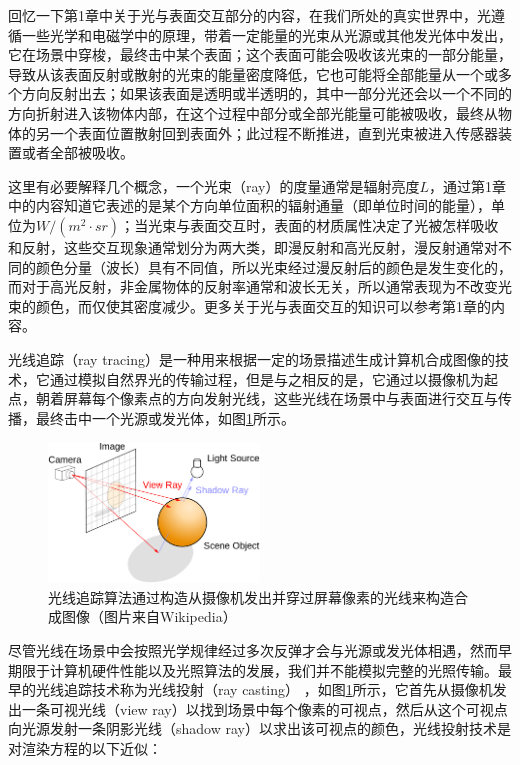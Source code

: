 回忆一下第1章中关于光与表面交互部分的内容，在我们所处的真实世界中，光遵循一些光学和电磁学中的原理，带着一定能量的光束从光源或其他发光体中发出，它在场景中穿梭，最终击中某个表面；这个表面可能会吸收该光束的一部分能量，导致从该表面反射或散射的光束的能量密度降低，它也可能将全部能量从一个或多个方向反射出去；如果该表面是透明或半透明的，其中一部分光还会以一个不同的方向折射进入该物体内部，在这个过程中部分或全部光能量可能被吸收，最终从物体的另一个表面位置散射回到表面外；此过程不断推进，直到光束被进入传感器装置或者全部被吸收。

这里有必要解释几个概念，一个光束（ray）的度量通常是辐射亮度$L$，通过第1章中的内容知道它表述的是某个方向单位面积的辐射通量（即单位时间的能量），单位为$W/(m^2\cdot sr)$；当光束与表面交互时，表面的材质属性决定了光被怎样吸收和反射，这些交互现象通常划分为两大类，即漫反射和高光反射，漫反射通常对不同的颜色分量（波长）具有不同值，所以光束经过漫反射后的颜色是发生变化的，而对于高光反射，非金属物体的反射率通常和波长无关，所以通常表现为不改变光束的颜色，而仅使其密度减少。更多关于光与表面交互的知识可以参考第1章的内容。

光线追踪（ray tracing）是一种用来根据一定的场景描述生成计算机合成图像的技术，它通过模拟自然界光的传输过程，但是与之相反的是，它通过以摄像机为起点，朝着屏幕每个像素点的方向发射光线，这些光线在场景中与表面进行交互与传播，最终击中一个光源或发光体，如图\ref{f:pt-ray-tracing}所示。

\begin{figure}
\sidecaption
	\includegraphics[width=0.5\textwidth]{figures/pt/path-1}
	\caption{光线追踪算法通过构造从摄像机发出并穿过屏幕像素的光线来构造合成图像（图片来自Wikipedia）}
	\label{f:pt-ray-tracing}
\end{figure}

尽管光线在场景中会按照光学规律经过多次反弹才会与光源或发光体相遇，然而早期限于计算机硬件性能以及光照算法的发展，我们并不能模拟完整的光照传输。最早的光线追踪技术称为光线投射（ray casting） \cite{a:Sometechniquesforshadingmachinerenderingsofsolids}，如图\ref{f:pt-ray-tracing}所示，它首先从摄像机发出一条可视光线（view ray）以找到场景中每个像素的可视点，然后从这个可视点向光源发射一条阴影光线（shadow ray）以求出该可视点的颜色，光线投射技术是对渲染方程的以下近似：

